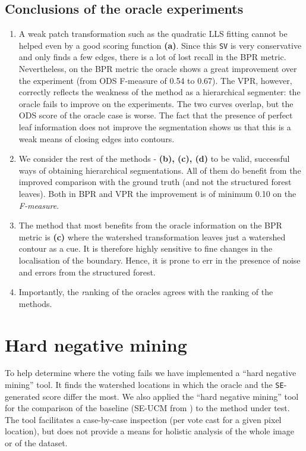\subsection{Conclusions of the oracle experiments}
\begin{enumerate}
 \item A weak patch transformation such as the quadratic LLS fitting cannot be helped even by a good scoring function {\bf (a)}. Since this {\tt SV} is very conservative and only finds a few edges, there is a lot of lost recall in the BPR metric. Nevertheless, on the BPR metric the oracle shows a great improvement over the experiment (from ODS F-measure of 0.54 to 0.67). 
 The VPR, however, correctly reflects the weakness of the method as a hierarchical segmenter: the oracle fails to improve on the experiments. The two curves overlap, but the ODS score of the oracle case is worse. %
 The fact that the presence of perfect leaf information does not improve the segmentation shows us that this is a weak means of %
 closing edges into contours.
 \item We consider the rest of the methods - {\bf (b), (c), (d)} to be valid, successful ways of obtaining hierarchical segmentations. All of them do benefit from the improved comparison with the ground truth (and not the structured forest leaves). Both in BPR and VPR the improvement is of minimum 0.10 on the {\it F-measure}.
 \item The method that most benefits from the oracle information on the BPR metric is {\bf (c)} where the watershed transformation leaves just a watershed contour as a cue. It is therefore highly %
 sensitive to fine changes in the localisation of the boundary. Hence, it is prone to err in the presence of noise and errors from the structured forest.
 \item Importantly, the {\emph ranking of the oracles agrees with the ranking of the methods}.
\end{enumerate}

\section{Hard %
negative mining}
To help determine where the voting fails %
we have implemented a ``hard negative mining'' tool. It finds %
the watershed locations in which the oracle and the {\tt SE}-generated score differ the most. We also applied the ``hard negative mining'' tool for the comparison of the baseline (SE-UCM from ) to the method under test. The tool facilitates a case-by-case %
inspection (per vote cast for a given pixel location), but does not provide a means for holistic analysis of the whole image or of the dataset.

